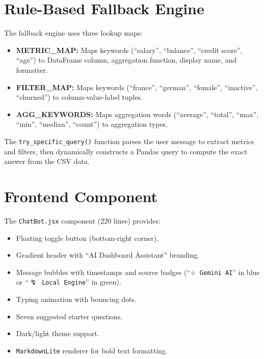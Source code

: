 \documentclass[12pt, a4paper]{report}
\begin{document}
\section{Rule-Based Fallback Engine}

The fallback engine uses three lookup maps:

\begin{itemize}
    \item \textbf{METRIC\_MAP:} Maps keywords (``salary'', ``balance'', ``credit score'', ``age'') to DataFrame column, aggregation function, display name, and formatter.
    \item \textbf{FILTER\_MAP:} Maps keywords (``france'', ``german'', ``female'', ``inactive'', ``churned'') to column-value-label tuples.
    \item \textbf{AGG\_KEYWORDS:} Maps aggregation words (``average'', ``total'', ``max'', ``min'', ``median'', ``count'') to aggregation types.
\end{itemize}

The \texttt{try\_specific\_query()} function parses the user message to extract metrics and filters, then dynamically constructs a Pandas query to compute the exact answer from the CSV data.

\section{Frontend Component}

The \texttt{ChatBot.jsx} component (220 lines) provides:
\begin{itemize}
    \item Floating toggle button (bottom-right corner).
    \item Gradient header with ``AI Dashboard Assistant'' branding.
    \item Message bubbles with timestamps and source badges (``\texttt{$\diamond$ Gemini AI}'' in blue or ``\texttt{$\lightning$ Local Engine}'' in green).
    \item Typing animation with bouncing dots.
    \item Seven suggested starter questions.
    \item Dark/light theme support.
    \item \texttt{MarkdownLite} renderer for bold text formatting.
\end{itemize}


\end{document}
